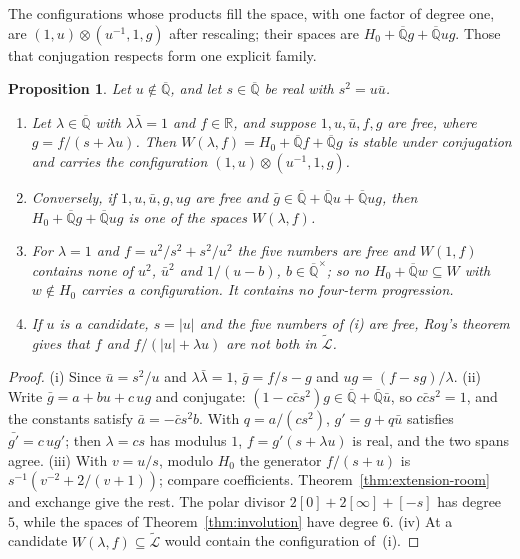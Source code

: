 \documentclass[11pt,a4paper]{article}
\theoremstyle{plain}
\newtheorem{proposition}[theorem]{Proposition}
\theoremstyle{definition}
\newcommand{\R}{\mathbb{R}}
\newcommand{\Alg}{\overline{\mathbb{Q}}}
\newcommand{\aLogs}{\widetilde{\mathcal{L}}}
\begin{document}
The configurations whose products fill the space, with one factor of degree one, are $(1,u)\otimes(u^{-1},1,g)$ after
rescaling; their spaces are $H_{0}+\Alg g+\Alg ug$. Those that conjugation respects form one explicit family.

\begin{proposition}\label{prop:real-pencil}
Let $u\notin\Alg$, and let $s\in\Alg$ be real with $s^{2}=u\bar u$.
\begin{enumerate}[label=\textup{(\roman*)}]
\item Let $\lambda\in\Alg$ with $\lambda\bar\lambda=1$ and $f\in\R$, and suppose $1,u,\bar u,f,g$ are free, where
$g=f/(s+\lambda u)$. Then $W(\lambda,f)=H_{0}+\Alg f+\Alg g$ is stable under conjugation and carries the
configuration $(1,u)\otimes(u^{-1},1,g)$.
\item Conversely, if $1,u,\bar u,g,ug$ are free and $\bar g\in\Alg+\Alg u+\Alg ug$, then $H_{0}+\Alg g+\Alg ug$ is one
of the spaces $W(\lambda,f)$.
\item For $\lambda=1$ and $f=u^{2}/s^{2}+s^{2}/u^{2}$ the five numbers are free and $W(1,f)$ contains none of $u^{2}$,
$\bar u^{2}$ and $1/(u-b)$, $b\in\Alg^{\times}$; so no $H_{0}+\Alg w\subseteq W$ with $w\notin H_{0}$ carries a
configuration. It contains no four-term progression.
\item If $u$ is a candidate, $s=|u|$ and the five numbers of (i) are free, Roy's theorem gives that $f$ and
$f/(|u|+\lambda u)$ are not both in $\aLogs$.
\end{enumerate}
\end{proposition}

\begin{proof}
(i) Since $\bar u=s^{2}/u$ and $\lambda\bar\lambda=1$, $\bar g=f/s-g$ and $ug=(f-sg)/\lambda$. (ii) Write
$\bar g=a+bu+c\,ug$ and conjugate: $(1-c\bar cs^{2})g\in\Alg+\Alg\bar u$, so $c\bar cs^{2}=1$, and the constants
satisfy $\bar a=-\bar cs^{2}b$. With $q=a/(cs^{2})$, $g'=g+q\bar u$ satisfies $\bar{g'}=c\,ug'$; then $\lambda=cs$ has
modulus $1$, $f=g'(s+\lambda u)$ is real, and the two spans agree. (iii) With $v=u/s$, modulo $H_{0}$ the generator
$f/(s+u)$ is $s^{-1}(v^{-2}+2/(v+1))$; compare coefficients. Theorem~\ref{thm:extension-room} and exchange give the
rest. The polar divisor $2[0]+2[\infty]+[-s]$ has degree $5$, while the spaces of Theorem~\ref{thm:involution} have
degree $6$. (iv) At a candidate $W(\lambda,f)\subseteq\aLogs$ would contain the configuration of~(i).
\end{proof}
\end{document}
